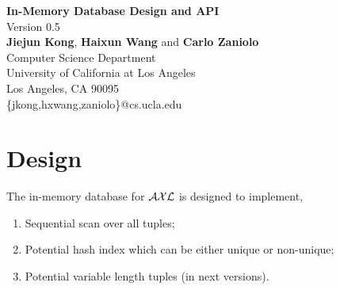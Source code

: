 \documentclass[11pt]{article}
\newcommand{\AXL}{$\cal AXL$}
\begin{document}

\setcounter{page}{1}

\begin{center}
{\LARGE \bf In-Memory Database Design and API}\\
Version 0.5\\
\vspace{0.25cm}
{\large {\bf Jiejun Kong}, {\bf Haixun Wang} and {\bf Carlo Zaniolo}\\
Computer Science Department\\ 
University of California at Los Angeles\\ 
Los Angeles, CA 90095}\\
\small{ \{jkong,hxwang,zaniolo\}@cs.ucla.edu}
\end{center}





\section{Design}

The in-memory database for {\AXL} is designed to implement,
\begin{enumerate}
\item Sequential scan over all tuples;
\item Potential hash index which can be either unique or non-unique;
\item Potential variable length tuples (in next versions).
\end{enumerate}
\end{document}

